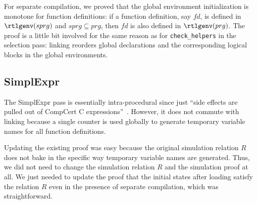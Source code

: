 For separate compilation, we proved that the global environment
initialization is monotone for function definitions: if a function
definition, say $fd$, is defined in $\rtlgenv(sprg)$ and $sprg
\subseteq prg$, then $fd$ is also defined in $\rtlgenv(prg)$.  The
proof is a little bit involved for the same reason as for
\texttt{check\_helpers} in the selection pass: linking reorders global
declarations and the corresponding logical blocks in the global
environments.


\subsection{SimplExpr}
The SimplExpr pass is essentially intra-procedural since just ``side
effects are pulled out of CompCert C expressions''~\cite{compcert-website}.
However, it does not commute with linking because a single counter is
used globally to generate temporary variable names for all function
definitions.

Updating the existing proof was easy because the original simulation
relation $R$ does not bake in the specific way temporary variable
names are generated. Thus, we did not need to change the simulation
relation $R$ and the simulation proof at all.  We just needed to
update the proof that the initial states after loading satisfy the
relation $R$ even in the presence of separate compilation, which
was straightforward.




